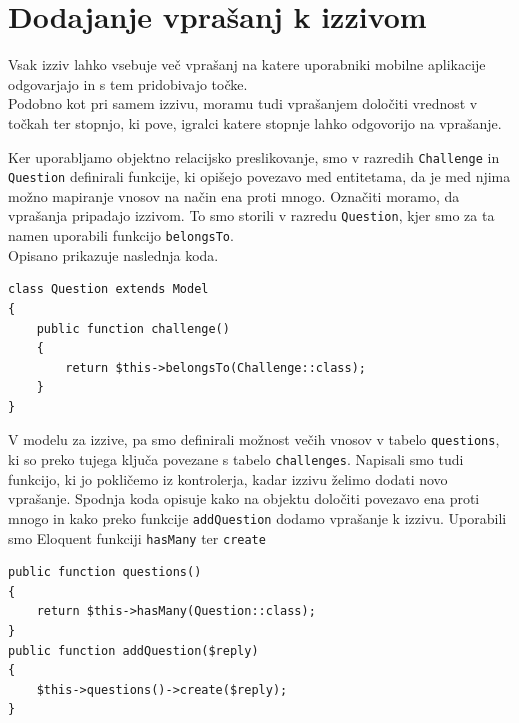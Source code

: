 \documentclass[a4paper, 12pt]{book}
\begin{document}
\section{Dodajanje vprašanj k izzivom}
Vsak izziv lahko vsebuje več vprašanj na katere uporabniki mobilne aplikacije odgovarjajo in s tem pridobivajo točke.\\Podobno kot pri samem izzivu, moramu tudi vprašanjem določiti vrednost v točkah ter stopnjo, ki pove, igralci katere stopnje lahko odgovorijo na vprašanje.

Ker uporabljamo objektno relacijsko preslikovanje, smo v razredih \texttt{Challenge} in \texttt{Question} definirali funkcije, ki opišejo povezavo med entitetama, da je med njima možno mapiranje vnosov na način ena proti mnogo. Označiti moramo, da vprašanja pripadajo izzivom. To smo storili v razredu \texttt{Question}, kjer smo za ta namen uporabili funkcijo \texttt{belongsTo}.\\Opisano prikazuje naslednja koda.

\begin{lstlisting}
class Question extends Model
{
    public function challenge()
    {
        return $this->belongsTo(Challenge::class);
    }
}
\end{lstlisting}
V modelu za izzive, pa smo definirali možnost večih vnosov v tabelo \texttt{questions}, ki so preko tujega ključa povezane s tabelo \texttt{challenges}. Napisali smo tudi funkcijo, ki jo pokličemo iz kontrolerja, kadar izzivu želimo dodati novo vprašanje. Spodnja koda opisuje kako na objektu določiti povezavo ena proti mnogo in kako preko funkcije \texttt{addQuestion} dodamo vprašanje k izzivu. Uporabili smo Eloquent funkciji \texttt{hasMany} ter \texttt{create}
\begin{lstlisting}
public function questions()
{
    return $this->hasMany(Question::class);
}
public function addQuestion($reply)
{
    $this->questions()->create($reply);
}
\end{lstlisting}
\end{document}
